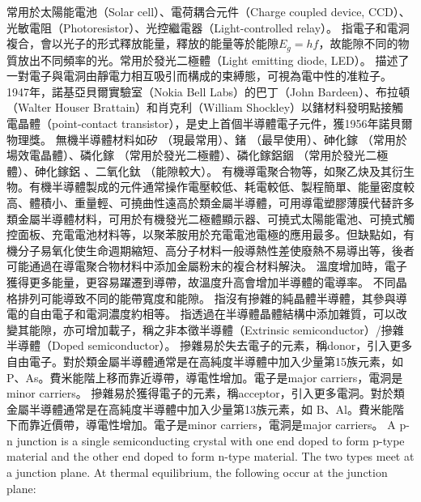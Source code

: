 \documentclass[a4paper,12pt]{article}
\begin{document}
常用於太陽能電池（Solar cell）、電荷耦合元件（Charge coupled device, CCD）、光敏電阻（Photoresistor）、光控繼電器（Light-controlled relay）。
指電子和電洞複合，會以光子的形式釋放能量，釋放的能量等於能隙$E_g=hf$，故能隙不同的物質放出不同頻率的光。常用於發光二極體（Light emitting diode, LED）。
描述了一對電子與電洞由靜電力相互吸引而構成的束縛態，可視為電中性的准粒子。
1947年，諾基亞貝爾實驗室（Nokia Bell Labs）的巴丁（John Bardeen）、布拉頓（Walter Houser Brattain）和肖克利（William Shockley）以鍺材料發明點接觸電晶體（point-contact transistor），是史上首個半導體電子元件，獲1956年諾貝爾物理獎。
無機半導體材料如矽 （現最常用）、鍺 （最早使用）、砷化鎵 （常用於場效電晶體）、磷化鎵 （常用於發光二極體）、磷化鎵鋁銦 （常用於發光二極體）、砷化鎵鋁 、二氧化鈦 （能隙較大）。
有機導電聚合物等，如聚乙炔及其衍生物。有機半導體製成的元件通常操作電壓較低、耗電較低、製程簡單、能量密度較高、體積小、重量輕、可撓曲性遠高於類金屬半導體，可用導電塑膠薄膜代替許多類金屬半導體材料，可用於有機發光二極體顯示器、可撓式太陽能電池、可撓式觸控面板、充電電池材料等，以聚苯胺用於充電電池電極的應用最多。但缺點如，有機分子易氧化使生命週期縮短、高分子材料一般導熱性差使廢熱不易導出等，後者可能通過在導電聚合物材料中添加金屬粉末的複合材料解決。
溫度增加時，電子獲得更多能量，更容易躍遷到導帶，故溫度升高會增加半導體的電導率。
不同晶格排列可能導致不同的能帶寬度和能隙。
指沒有摻雜的純晶體半導體，其參與導電的自由電子和電洞濃度約相等。
指透過在半導體晶體結構中添加雜質，可以改變其能隙，亦可增加載子，稱之非本徵半導體（Extrinsic semiconductor）/摻雜半導體（Doped semiconductor）。
摻雜易於失去電子的元素，稱donor，引入更多自由電子。對於類金屬半導體通常是在高純度半導體中加入少量第15族元素，如 P、As。費米能階上移而靠近導帶，導電性增加。電子是major carriers，電洞是minor carriers。
摻雜易於獲得電子的元素，稱acceptor，引入更多電洞。對於類金屬半導體通常是在高純度半導體中加入少量第13族元素，如 B、Al。費米能階下而靠近價帶，導電性增加。電子是minor carriers，電洞是major carriers。
A p-n junction is a single semiconducting crystal with one end doped to form p-type material and the other end doped to form n-type material. The two types meet at a junction plane. At thermal equilibrium, the following occur at the junction plane:
\end{document}
